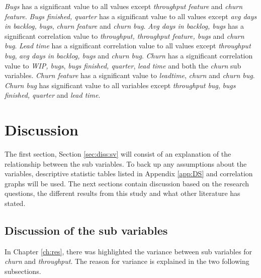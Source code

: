 \documentclass[UKenglish]{ifimaster}  %
\begin{document}
\textit{Bugs} has a significant value to all values except \textit{throughput feature} and \textit{churn feature}. \textit{Bugs finished, quarter} has a significant value to all values except \textit{avg days in backlog, bugs}, \textit{churn feature} and \textit{churn bug}. \textit{Avg days in backlog, bugs} has a significant correlation value to \textit{throughput, throughput feature, bugs} and \textit{churn bug}. \textit{Lead time} has a significant correlation value to all values except \textit{throughput bug}, \textit{avg days in backlog, bugs} and \textit{churn bug}. \textit{Churn} has a significant correlation value to \textit{WIP, bugs}, \textit{bugs finished, quarter}, \textit{lead time} and both the \textit{churn} sub variables. \textit{Churn feature} has a significant value to \textit{leadtime}, \textit{churn} and \textit{churn bug}. \textit{Churn bug} has significant value to all variables except \textit{throughput bug}, \textit{bugs finished, quarter} and \textit{lead time}.




\chapter{Discussion}
\label{ch:dis}
The first section, Section \ref{sec:diss:sv} will consist of an explanation of the relationship between the sub variables. To back up any assumptions about the variables, descriptive statistic tables listed in Appendix \ref{app:DS} and correlation graphs will be used. The next sections contain discussion based on the research questions, the different results from this study and what other literature has stated. 



\section{Discussion of the sub variables}
In Chapter \ref{ch:res}, there was highlighted the variance between sub variables for \textit{churn} and \textit{throughput}. The reason for variance is explained in the two following subsections.
\label{sec:diss:sv}
\end{document}
